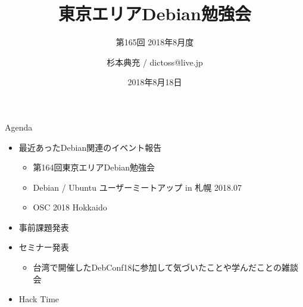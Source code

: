 \title{東京エリアDebian勉強会}
\subtitle{第165回 2018年8月度}
\author{杉本典充 / dictoss@live.jp}
\date{2018年8月18日}



\begin{frame}
\titlepage{}
\end{frame}

\begin{frame}{Agenda}
 \begin{minipage}[t]{0.45\hsize}
  \begin{itemize}
  \item 最近あったDebian関連のイベント報告
    \begin{itemize}
    \item 第164回東京エリアDebian勉強会
    \item Debian / Ubuntu ユーザーミートアップ in 札幌 2018.07
    \item OSC 2018 Hokkaido 
    \end{itemize}
  \item 事前課題発表
  \end{itemize}
 \end{minipage}
 \begin{minipage}[t]{0.45\hsize}
  \begin{itemize}
  \item セミナー発表
    \begin{itemize}
    \item 台湾で開催したDebConf18に参加して気づいたことや学んだことの雑談会
    \end{itemize}
  \item Hack Time
  \end{itemize}
 \end{minipage}
\end{frame}


